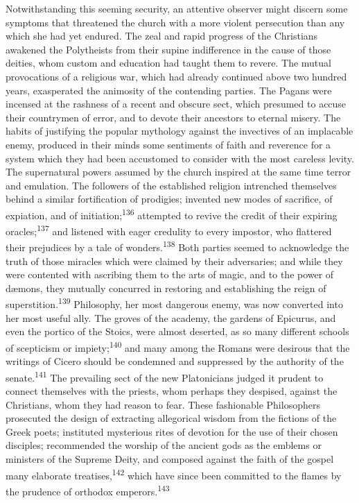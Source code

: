 Notwithstanding this seeming security, an attentive observer
might discern some symptoms that threatened the church with a
more violent persecution than any which she had yet endured. The
zeal and rapid progress of the Christians awakened the
Polytheists from their supine indifference in the cause of those
deities, whom custom and education had taught them to revere. The
mutual provocations of a religious war, which had already
continued above two hundred years, exasperated the animosity of
the contending parties. The Pagans were incensed at the rashness
of a recent and obscure sect, which presumed to accuse their
countrymen of error, and to devote their ancestors to eternal
misery. The habits of justifying the popular mythology against
the invectives of an implacable enemy, produced in their minds
some sentiments of faith and reverence for a system which they
had been accustomed to consider with the most careless levity.
The supernatural powers assumed by the church inspired at the
same time terror and emulation. The followers of the established
religion intrenched themselves behind a similar fortification of
prodigies; invented new modes of sacrifice, of expiation, and of
initiation;\textsuperscript{136} attempted to revive the credit of their expiring
oracles;\textsuperscript{137} and listened with eager credulity to every impostor,
who flattered their prejudices by a tale of wonders.\textsuperscript{138} Both
parties seemed to acknowledge the truth of those miracles which
were claimed by their adversaries; and while they were contented
with ascribing them to the arts of magic, and to the power of
dæmons, they mutually concurred in restoring and establishing the
reign of superstition.\textsuperscript{139} Philosophy, her most dangerous enemy,
was now converted into her most useful ally. The groves of the
academy, the gardens of Epicurus, and even the portico of the
Stoics, were almost deserted, as so many different schools of
scepticism or impiety;\textsuperscript{140} and many among the Romans were
desirous that the writings of Cicero should be condemned and
suppressed by the authority of the senate.\textsuperscript{141} The prevailing
sect of the new Platonicians judged it prudent to connect
themselves with the priests, whom perhaps they despised, against
the Christians, whom they had reason to fear. These fashionable
Philosophers prosecuted the design of extracting allegorical
wisdom from the fictions of the Greek poets; instituted
mysterious rites of devotion for the use of their chosen
disciples; recommended the worship of the ancient gods as the
emblems or ministers of the Supreme Deity, and composed against
the faith of the gospel many elaborate treatises,\textsuperscript{142} which have
since been committed to the flames by the prudence of orthodox
emperors.\textsuperscript{143}

